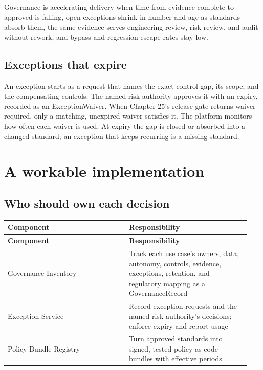 Governance is accelerating delivery when time from evidence-complete to approved is falling, open exceptions shrink in number and age as standards absorb them, the same evidence serves engineering review, risk review, and audit without rework, and bypass and regression-escape rates stay low.\par

\subsection{Exceptions that expire}

An exception starts as a request that names the exact control gap, its scope, and the compensating controls. The named risk authority approves it with an expiry, recorded as an ExceptionWaiver. When Chapter 25's release gate returns waiver-required, only a matching, unexpired waiver satisfies it. The platform monitors how often each waiver is used. At expiry the gap is closed or absorbed into a changed standard; an exception that keeps recurring is a missing standard.\par

\section{A workable implementation}

\subsection{Who should own each decision}

\BookTableStart
\small
\begin{longtable}{@{}Y{0.4700\linewidth}Y{0.4700\linewidth}@{}}
\color{white}\bfseries \textbf{Component} & \color{white}\bfseries \textbf{Responsibility} \\
\endfirsthead
{}
\color{white}\bfseries \textbf{Component} & \color{white}\bfseries \textbf{Responsibility} \\
\endhead
Governance Inventory & Track each use case's owners, data, autonomy, controls, evidence, exceptions, retention, and regulatory mapping as a GovernanceRecord \\
Exception Service & Record exception requests and the named risk authority's decisions; enforce expiry and report usage \\
Policy Bundle Registry & Turn approved standards into signed, tested policy-as-code bundles with effective periods \\
\end{longtable}
\BookTableEnd

